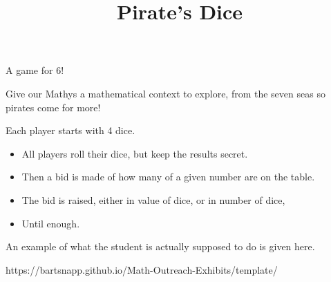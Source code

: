 \documentclass{../exhibit}
\title{Pirate's Dice}
\begin{document}
\begin{context}
  A game for 6!

  Give our Mathys a mathematical context to explore, from the seven
  seas  so pirates come for more!
\end{context}



\begin{directions}
  Each player starts with 4 dice.
  \begin{itemize}
  \item All players roll their dice, but keep the results secret.
  \item Then a bid is made of how many of a given number are on the table.
  \item The bid is raised, either in value of dice, or in number of dice,
  \item Until enough.
  \end{itemize}
\end{directions}



\begin{example}
  An example of what the student is actually supposed to do is given
  here.
\end{example}



\begin{mathConnections}
  https://bartsnapp.github.io/Math-Outreach-Exhibits/template/
\end{mathConnections}
\end{document}
